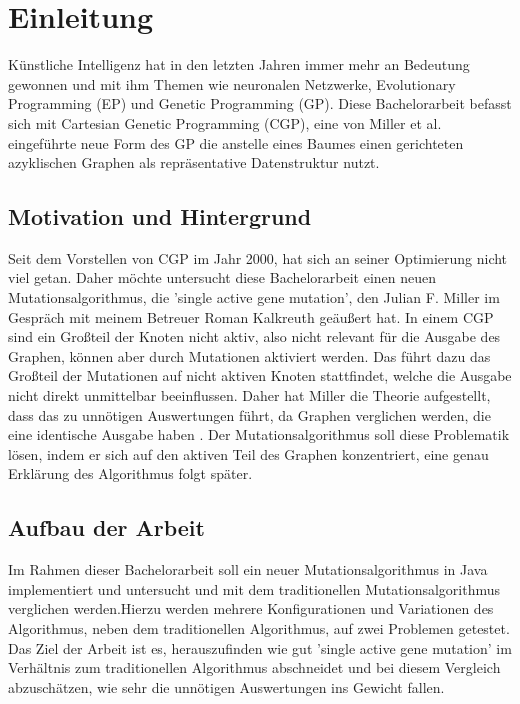 \chapter{Einleitung}
\label{cha:einleitung}

Künstliche Intelligenz hat in den letzten Jahren immer mehr an Bedeutung gewonnen und mit ihm Themen wie neuronalen Netzwerke, Evolutionary Programming (EP) und Genetic Programming (GP). Diese Bachelorarbeit befasst sich mit Cartesian Genetic Programming (CGP), eine von Miller et al. 
eingeführte neue Form des GP die anstelle eines Baumes einen gerichteten azyklischen Graphen als repräsentative Datenstruktur nutzt.


\section{Motivation und Hintergrund}
\label{sec:motivation_und_hintergrund}

Seit dem Vorstellen von CGP im Jahr 2000, hat sich an seiner Optimierung nicht viel getan. 
Daher möchte untersucht diese Bachelorarbeit einen neuen Mutationsalgorithmus, die 'single active gene mutation', den Julian F. Miller im Gespräch mit meinem Betreuer Roman Kalkreuth geäußert hat. 
In einem CGP sind ein Großteil der Knoten nicht aktiv, also nicht relevant für die Ausgabe des Graphen, können aber durch Mutationen aktiviert werden. 
Das führt dazu das Großteil der Mutationen auf nicht aktiven Knoten stattfindet, welche die Ausgabe nicht direkt unmittelbar beeinflussen. 
Daher hat Miller die Theorie aufgestellt, dass das zu unnötigen Auswertungen führt, da Graphen verglichen werden, die eine identische Ausgabe haben
. 
Der Mutationsalgorithmus soll diese Problematik lösen, indem er sich auf den aktiven Teil des Graphen konzentriert, eine genau Erklärung des Algorithmus folgt später. 




\section{Aufbau der Arbeit}
\label{sec:aufbau}

Im Rahmen dieser Bachelorarbeit soll ein neuer Mutationsalgorithmus in Java implementiert und untersucht und mit dem traditionellen Mutationsalgorithmus verglichen werden.Hierzu werden mehrere Konfigurationen und Variationen des Algorithmus, neben dem traditionellen Algorithmus, auf zwei Problemen getestet. Das Ziel der Arbeit ist es, herauszufinden wie gut 'single active gene mutation' im Verhältnis zum traditionellen Algorithmus abschneidet und bei diesem Vergleich abzuschätzen, wie sehr die unnötigen Auswertungen ins Gewicht fallen.


